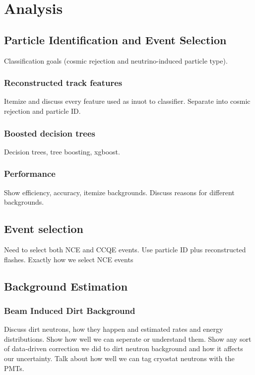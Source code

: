 \section{Analysis}\label{analysis}
\hspace{\parindent}

\subsection{Particle Identification and Event Selection}
  Classification goals (cosmic rejection and neutrino-induced particle type).
  \subsubsection{Reconstructed track features}
    Itemize and discuss every feature used as inuot to classifier.
    Separate into cosmic rejection and particle ID.
  \subsubsection{Boosted decision trees}
    Decision trees, tree boosting, xgboost.
  \subsubsection{Performance}
    Show efficiency, accuracy, itemize backgrounds.
    Discuss reasons for different backgrounds.
  \subsection{Event selection}
    Need to select both NCE and CCQE events.
    Use particle ID plus reconstructed flashes.
    Exactly how we select NCE events 

\subsection{Background Estimation}\label{background}
  \subsubsection{Beam Induced Dirt Background}
    Discuss dirt neutrons, how they happen and estimated rates and energy
    distributions.  Show how well we can seperate or understand them. Show any
    sort of data-driven correction we did to dirt neutron background and how it
    affects our uncertainty. Talk about how well we can tag cryostat neutrons
    with the PMTs.
